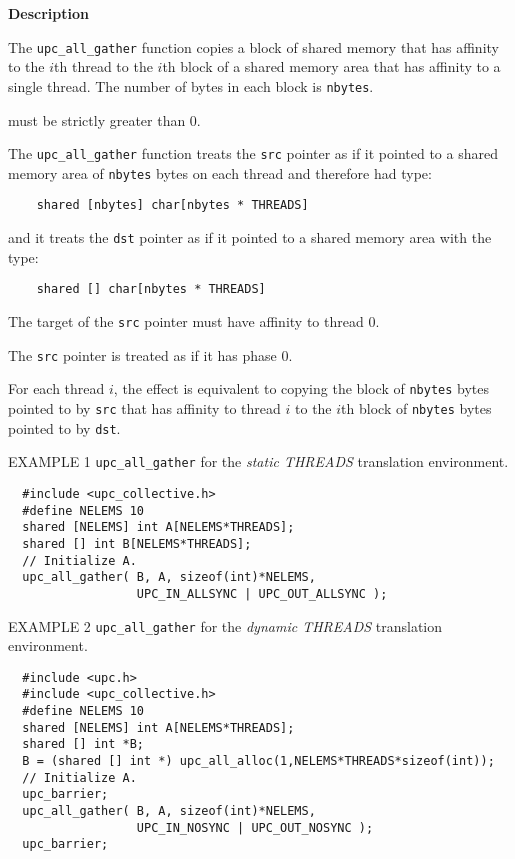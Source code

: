 {\bf Description} 

\np The {\tt upc\_all\_gather} function copies a block of shared memory
that has affinity to the $i$th thread to the $i$th block
of a shared memory area that has affinity to a single thread.
The number of bytes in each block is {\tt nbytes}.

 must be strictly greater than 0.

\np The {\tt upc\_all\_gather} function treats the {\tt src} pointer
as if it pointed to a shared memory area of {\tt nbytes} bytes on each
thread and therefore had type:

\begin{verbatim}
    shared [nbytes] char[nbytes * THREADS]
\end{verbatim}  

\np and it treats the {\tt dst} pointer as if it pointed to a shared
memory area with the type:

\begin{verbatim}
    shared [] char[nbytes * THREADS]
\end{verbatim} 

\np The target of the {\tt src} pointer must have affinity to thread 0.

\np The {\tt src} pointer is treated as if it has phase 0.

\np For each thread $i$, the effect is equivalent to copying
the block of {\tt nbytes} bytes
pointed to by {\tt src} that has affinity to thread $i$
to the $i$th block of {\tt nbytes} bytes pointed to by {\tt dst}.


\np EXAMPLE 1 {\tt upc\_all\_gather} for the {\em static THREADS}
translation environment.

\begin{verbatim}
  #include <upc_collective.h>
  #define NELEMS 10
  shared [NELEMS] int A[NELEMS*THREADS];
  shared [] int B[NELEMS*THREADS];
  // Initialize A.
  upc_all_gather( B, A, sizeof(int)*NELEMS,
                  UPC_IN_ALLSYNC | UPC_OUT_ALLSYNC );
\end{verbatim}

\np EXAMPLE 2 {\tt upc\_all\_gather} for the {\em dynamic THREADS}
translation environment.

\begin{verbatim}
  #include <upc.h>
  #include <upc_collective.h>
  #define NELEMS 10
  shared [NELEMS] int A[NELEMS*THREADS];
  shared [] int *B;
  B = (shared [] int *) upc_all_alloc(1,NELEMS*THREADS*sizeof(int));
  // Initialize A.
  upc_barrier;
  upc_all_gather( B, A, sizeof(int)*NELEMS,
                  UPC_IN_NOSYNC | UPC_OUT_NOSYNC );
  upc_barrier;
\end{verbatim}

